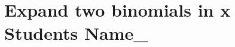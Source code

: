 \documentclass[12pt, a4paper, addpoints]{exam}
\newcommand{\ps}{\vspace{6mm}}
\newcommand{\qs}{\vspace{26mm}}
\newcommand{\randprime}{%
    \pgfmathparse{int(random(1,5))}%
    \let\temp=\pgfmathresult%
    \ifnum\temp=1 2\else%
    \ifnum\temp=2 3\else%
    \ifnum\temp=3 5\else%
    \ifnum\temp=4 7\else%
    \ifnum\temp=5 11\else%
    \ifnum\temp=6 13\else%
    \ifnum\temp=7 17\else%
    \ifnum\temp=8 19\fi\fi\fi\fi\fi\fi\fi\fi%
}
\begin{document}
\section*{Expand two binomials in x    \quad  Students Name_ \underline{\hspace{5cm}}}
\begin{questions}
\LARGE

\question
\setlength{\columnsep}{20pt}
\begin{multicols}{2}
\end{multicols}
\qs



\question
\setlength{\columnsep}{20pt}
\begin{multicols}{2}
\end{multicols}
\qs

\question
\setlength{\columnsep}{20pt}
\begin{multicols}{2}
\begin{parts}

\end{parts}
\end{multicols}
\end{questions}
\end{document}
